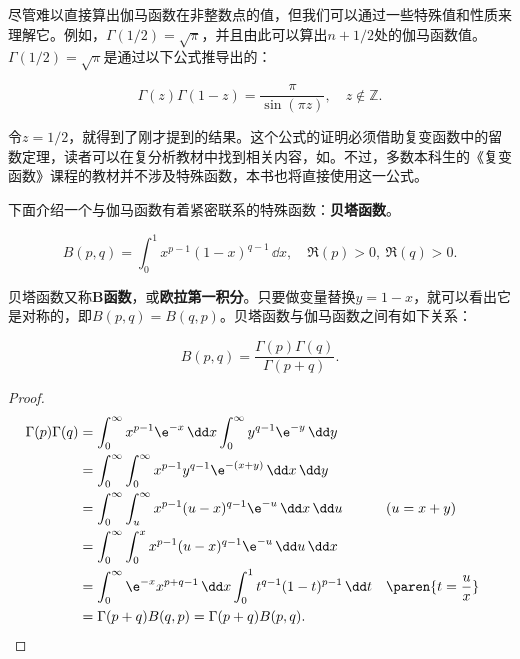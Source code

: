 尽管难以直接算出伽马函数在非整数点的值，但我们可以通过一些特殊值和性质来理解它。例如，$\Gamma(1/2)=\sqrt{\pi}$，并且由此可以算出$n+1/2$处的伽马函数值。$\Gamma(1/2)=\sqrt{\pi}$是通过以下公式推导出的：
\begin{claim}[余元公式]
    \begin{equation}
        \Gamma(z)\Gamma(1-z)=\frac{\pi}{\sin(\pi z)},\quad z\notin \mathbb{Z}.
    \end{equation}
\end{claim}

令$z=1/2$，就得到了刚才提到的结果。这个公式的证明必须借助复变函数中的留数定理，读者可以在复分析教材中找到相关内容，如\cite{Function_Theory}。不过，多数本科生的《复变函数》课程的教材并不涉及特殊函数，本书也将直接使用这一公式。

下面介绍一个与伽马函数有着紧密联系的特殊函数：\textbf{贝塔函数}。

\begin{definition}[贝塔函数]
    \begin{equation}
        B(p,q)=\int_{0}^{1}x^{p-1}(1-x)^{q-1}\,\dd x,\quad \Re(p)>0,\ \Re(q)>0.
    \end{equation}
\end{definition}
贝塔函数又称\textbf{B函数}，或\textbf{欧拉第一积分}。只要做变量替换$y=1-x$，就可以看出它是对称的，即$B(p,q)=B(q,p)$。贝塔函数与伽马函数之间有如下关系：
\begin{theorem}
    \begin{equation}
        B(p,q)=\frac{\Gamma(p)\Gamma(q)}{\Gamma(p+q)}.
    \end{equation}
\end{theorem}
\begin{proof}
    \begin{align}
        \Gamma(p)\Gamma(q)&=\int_{0}^{\infty}x^{p-1}\e^{-x}\,\dd x\int_{0}^{\infty}y^{q-1}\e^{-y}\,\dd y\nonumber\\
        &=\int_{0}^{\infty}\int_{0}^{\infty}x^{p-1}y^{q-1}\e^{-(x+y)}\,\dd x\,\dd y\nonumber\\
        &=\int_{0}^{\infty}\int_{u}^{\infty}x^{p-1}(u-x)^{q-1}\e^{-u}\,\dd x\,\dd u&&(u=x+y)\nonumber\\
        &=\int_{0}^{\infty}\int_{0}^{x}x^{p-1}(u-x)^{q-1}\e^{-u}\,\dd u\,\dd x\nonumber\\
        &=\int_{0}^{\infty}\e^{-x}x^{p+q-1}\,\dd x\int_{0}^{1}t^{q-1}(1-t)^{p-1}\,\dd t&&\paren{t=\frac{u}{x}}\nonumber\\
        &=\Gamma(p+q)B(q,p)=\Gamma(p+q)B(p,q).
    \end{align}
\end{proof}

